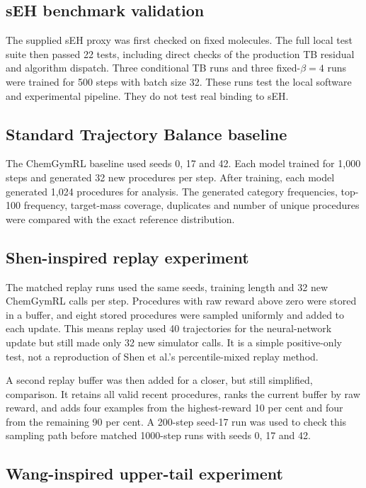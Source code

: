 \documentclass{article}
\begin{document}
\subsection{sEH benchmark validation}

The supplied sEH proxy was first checked on fixed molecules. The full local test suite then passed 22 tests, including direct checks of the production TB residual and algorithm dispatch. Three conditional TB runs and three fixed-$\beta=4$ runs were trained for 500 steps with batch size 32. These runs test the local software and experimental pipeline. They do not test real binding to sEH.

\subsection{Standard Trajectory Balance baseline}

The ChemGymRL baseline used seeds 0, 17 and 42. Each model trained for 1,000 steps and generated 32 new procedures per step. After training, each model generated 1,024 procedures for analysis. The generated category frequencies, top-100 frequency, target-mass coverage, duplicates and number of unique procedures were compared with the exact reference distribution.

\subsection{Shen-inspired replay experiment}

The matched replay runs used the same seeds, training length and 32 new ChemGymRL calls per step. Procedures with raw reward above zero were stored in a buffer, and eight stored procedures were sampled uniformly and added to each update. This means replay used 40 trajectories for the neural-network update but still made only 32 new simulator calls. It is a simple positive-only test, not a reproduction of Shen et al.'s percentile-mixed replay method.

A second replay buffer was then added for a closer, but still simplified, comparison. It retains all valid recent procedures, ranks the current buffer by raw reward, and adds four examples from the highest-reward 10 per cent and four from the remaining 90 per cent. A 200-step seed-17 run was used to check this sampling path before matched 1000-step runs with seeds 0, 17 and 42.

\subsection{Wang-inspired upper-tail experiment}
\end{document}
